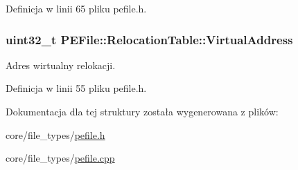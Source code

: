 Definicja w linii 65 pliku pefile.\-h.

\hypertarget{struct_p_e_file_1_1_relocation_table_aeb4180a2c4aac556753407e081bde7db}{
\subsubsection[{Virtual\-Address}]{\setlength{\rightskip}{0pt plus 5cm}uint32\-\_\-t P\-E\-File\-::\-Relocation\-Table\-::\-Virtual\-Address}}\label{struct_p_e_file_1_1_relocation_table_aeb4180a2c4aac556753407e081bde7db}


Adres wirtualny relokacji. 



Definicja w linii 55 pliku pefile.\-h.



Dokumentacja dla tej struktury została wygenerowana z plików\-:\begin{DoxyCompactItemize}
\item 
core/file\-\_\-types/\hyperlink{pefile_8h}{pefile.\-h}\item 
core/file\-\_\-types/\hyperlink{pefile_8cpp}{pefile.\-cpp}\end{DoxyCompactItemize}
